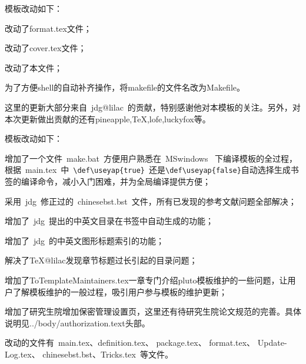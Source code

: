 模板改动如下：
\begin{hitlist}
\item 改动了format.tex文件；
\item 改动了cover.tex文件；
\item 改动了本文件；
\item 为了方便shell的自动补齐操作，将makefile的文件名改为Makefile。
\end{hitlist}
这里的更新大部分来自~jdg@lilac~的贡献，特别感谢他对本模板的关注。另外，对本次更新做出贡献的还有pineapple,TeX,lofe,luckyfox等。

模板改动如下：
\begin{hitlist}
 \item 增加了一个文件~make.bat~方便用户熟悉在~MSwindows~ 下编译模板的全过程，根据~main.tex~中~\verb|\def\useyap{true}|~还是\verb|\def\useyap{false}|自动选择生成书签的编译命令，减小入门困难，并为全局编译提供方便；
 \item 采用~jdg~修正过的~chinesebst.bst~文件，所有已发现的参考文献问题全部解决；
 \item 增加了~jdg~提出的中英文目录在书签中自动生成的功能；
 \item 增加了~jdg~的中英文图形标题索引的功能；
 \item 解决了TeX@lilac发现章节标题过长引起的目录问题；
 \item 增加了ToTemplateMaintainers.tex一章专门介绍pluto模板维护的一些问题，让用户了解模板维护的一般过程，吸引用户参与模板的维护更新；
 \item 增加了研究生院增加保密管理设置页，这里还有待研究生院论文规范的完善。具体说明见../body/authorization.text头部。
 \item 改动的文件有~main.tex、definition.tex、 package.tex、 format.tex、 Update-Log.tex、
  chinesebst.bst、Tricks.tex~等文件。
\end{hitlist}

